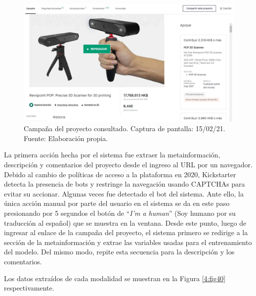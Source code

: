 \begin{figure}[!ht]
	\begin{center}
		\includegraphics[width=1\textwidth]{4/figures/example_project_150221.jpg}
		\caption[Campaña del proyecto consultado. Captura de pantalla: 15/02/21]{Campaña del proyecto consultado. Captura de pantalla: 15/02/21.\\
			Fuente: Elaboración propia.}
		\label{4:fig39}
	\end{center}
\end{figure}

La primera acción hecha por el sistema fue extraer la metainformación, descripción y comentarios del proyecto desde el ingreso al URL por un navegador. Debido al cambio de políticas de acceso a la plataforma en 2020, Kickstarter detecta la presencia de bots y restringe la navegación usando CAPTCHAs para evitar su accionar. Algunas veces fue detectado el bot del sistema. Ante ello, la única acción manual por parte del usuario en el sistema se da en este paso presionando por 5 segundos el botón de “\textit{I'm a human}” (Soy humano por su traducción al español) que se muestra en la ventana. Desde este punto, luego de ingresar al enlace de la campaña del proyecto, el sistema primero se redirige a la sección de la metainformación y extrae las variables usadas para el entrenamiento del modelo. Del mismo modo, repite esta secuencia para la descripción y los comentarios.

Los datos extraídos de cada modalidad se muestran en la Figura \ref{4:fig40} respectivamente.

